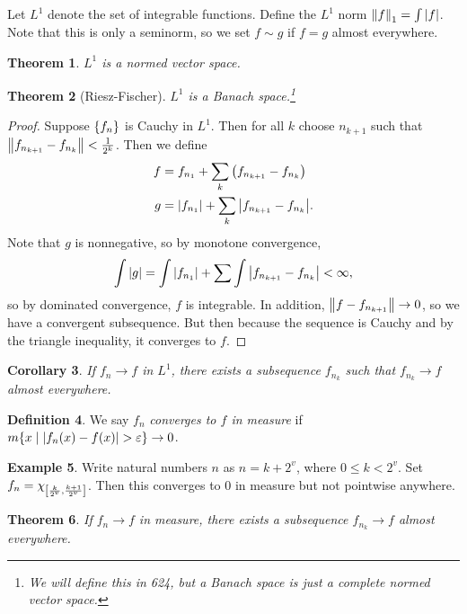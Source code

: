 \documentclass[leqno, openany]{memoir}
\newtheorem{thm}{Theorem}[chapter]
\newtheorem{cor}[thm]{Corollary}
\theoremstyle{definition}
\newtheorem{defn}[thm]{Definition}
\newtheorem{exm}[thm]{Example}
\theoremstyle{remark}
\theoremstyle{plain}
\theoremstyle{definition}
\theoremstyle{remark}
\newcommand{\ep}{\varepsilon}
\begin{document}
Let $L^1$ denote the set of integrable functions. Define the $L^1$ norm $\norm{f}_1 = \int \abs{f}$. Note that this is only a seminorm, so we set $f \sim g$ if $f = g$ almost everywhere.

\begin{thm}
    $L^1$ is a normed vector space.
\end{thm}

\begin{thm}[Riesz-Fischer]
    $L^1$ is a Banach space.\footnote{We will define this in 624, but a Banach space is just a complete normed vector space.}
\end{thm}

\begin{proof}
    Suppose $\qty{f_n}$ is Cauchy in $L^1$. Then for all $k$ choose $n_{k+1}$ such that $\norm{f_{n_{k+1}} - f_{n_k}} < \frac{1}{2^k}$. Then we define
    \begin{align*}
        f &= f_{n_1} + \sum_k \qty(f_{n_{k+1}} - f_{n_k}) \\
        g &= \abs{f_{n_1}} + \sum_k \abs{f_{n_{k+1}} - f_{n_k}}.
    \end{align*}
    Note that $g$ is nonnegative, so by monotone convergence, 
    \[ \int \abs{g} = \int \abs{f_{n_1}} + \sum \int \abs{f_{n_{k+1}} - f_{n_k}} < \infty, \]
    so by dominated convergence, $f$ is integrable. In addition, $\norm{f - f_{n_{k+1}}} \to 0$, so we have a convergent subsequence. But then because the sequence is Cauchy and by the triangle inequality, it converges to $f$.
\end{proof}

\begin{cor}
    If $f_n \to f$ in $L^1$, there exists a subsequence $f_{n_k}$ such that $f_{n_k} \to f$ almost everywhere.
\end{cor}

\begin{defn}
    We say $f_n$ \textit{converges to $f$ in measure} if $m \qty{x \mid \abs{f_n(x) - f(x)} > \ep} \to 0$.
\end{defn}

\begin{exm}
    Write natural numbers $n$ as $n = k + 2^v$, where $0 \leq k < 2^v$. Set $f_n = \chi_{\qty[\frac{k}{2^v}, \frac{k+1}{2^v}]}$. Then this converges to $0$ in measure but not pointwise anywhere.
\end{exm}

\begin{thm}
    If $f_n \to f$ in measure, there exists a subsequence $f_{n_k} \to f$ almost everywhere.
\end{thm}
\end{document}
